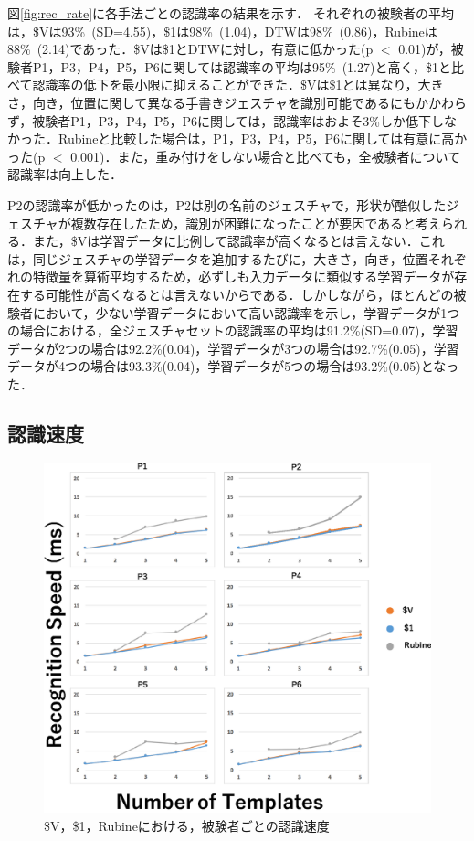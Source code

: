 図\ref{fig:rec_rate}に各手法ごとの認識率の結果を示す．
それぞれの被験者の平均は，\$Vは93\%~(SD=4.55)，\$1は98\%~(1.04)，DTWは98\%~(0.86)，Rubineは88\%~(2.14)であった．\$Vは\$1とDTWに対し，有意に低かった(p $<$ 0.01)が，被験者P1，P3，P4，P5，P6に関しては認識率の平均は95\%~(1.27)と高く，\$1と比べて認識率の低下を最小限に抑えることができた．\$Vは\$1とは異なり，大きさ，向き，位置に関して異なる手書きジェスチャを識別可能であるにもかかわらず，被験者P1，P3，P4，P5，P6に関しては，認識率はおよそ3\%しか低下しなかった．Rubineと比較した場合は，P1，P3，P4，P5，P6に関しては有意に高かった(p $<$ 0.001)．また，重み付けをしない場合と比べても，全被験者について認識率は向上した．

P2の認識率が低かったのは，P2は別の名前のジェスチャで，形状が酷似したジェスチャが複数存在したため，識別が困難になったことが要因であると考えられる．また，\$Vは学習データに比例して認識率が高くなるとは言えない．これは，同じジェスチャの学習データを追加するたびに，大きさ，向き，位置それぞれの特徴量を算術平均するため，必ずしも入力データに類似する学習データが存在する可能性が高くなるとは言えないからである．しかしながら，ほとんどの被験者において，少ない学習データにおいて高い認識率を示し，学習データが1つの場合における，全ジェスチャセットの認識率の平均は91.2\%(SD=0.07)，学習データが2つの場合は92.2\%(0.04)，学習データが3つの場合は92.7\%(0.05)，学習データが4つの場合は93.3\%(0.04)，学習データが5つの場合は93.2\%(0.05)となった．

\newpage
\subsection{認識速度}
\begin{figure}[!h]
\centering
\includegraphics[width=1.0\columnwidth]{img/rec_speed.eps}
\caption{\$V，\$1，Rubineにおける，被験者ごとの認識速度}
\label{fig:rec_speed}
\end{figure}


